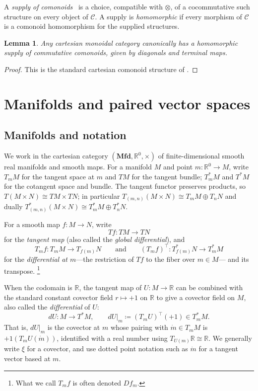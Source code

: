 \documentclass[11pt, oneside, article]{memoir}
\theoremstyle{definition}
\theoremstyle{plain}
\newtheorem{lemma}[lemma]{Lemma}
\newcommand{\cat}[1]{\mathcal{#1}}%
\newcommand{\Cat}[1]{\mathbf{#1}}%
\newcommand{\rr}{\mathbb{R}}
\newcommand{\qqand}{\qquad\text{and}\qquad}
\newcommand{\mfd}{\Cat{Mfd}}
\begin{document}
A \emph{supply of comonoids}~\cite{fong2019supplying} is a choice, compatible with $\otimes$, of a cocommutative such structure on every object of $\cat{C}$. A supply is \emph{homomorphic} if every morphism of $\cat C$ is a comonoid homomorphism for the supplied structures.

\begin{lemma}\label{lem.cartesian_homomorphic_supply}
Any cartesian monoidal category canonically has a homomorphic supply of commutative comonoids, given by diagonals and terminal maps.
\end{lemma}

\begin{proof}
This is the standard cartesian comonoid structure of \cite{fox1976coalgebras}.
\end{proof}

\section{Manifolds and paired vector spaces}\label{sec.lie_pnla_bg}

\subsection{Manifolds and notation}\label{sec.manifolds_notation}

We work in the cartesian category $(\mfd,\rr^0,\times)$ of finite-dimensional smooth real manifolds and smooth maps. For a manifold $M$ and point $m\colon\rr^0\to M$, write $T_mM$ for the tangent space at $m$ and $TM$ for the tangent bundle; $T^*_mM$ and $T^*M$ for the cotangent space and bundle. The tangent functor preserves products, so $T(M\times N)\cong TM\times TN$; in particular $T_{(m,n)}(M\times N)\cong T_mM\oplus T_nN$ and dually $T^*_{(m,n)}(M\times N)\cong T^*_mM\oplus T^*_nN$.

For a smooth map $f\colon M\to N$, write
\[
Tf\colon TM\to TN
\]
for the \emph{tangent map} (also called the \emph{global differential}), and
\[
T_m f\colon T_mM\to T_{f(m)}N
\qqand
(T_m f)^\top\colon T^*_{f(m)}N\to T^*_mM
\]
for the \emph{differential at $m$}---the restriction of $Tf$ to the fiber over $m\in M$--- and its transpose.%
\footnote{What we call $T_m f$ is often denoted $Df_m$.}

When the codomain is $\rr$, the tangent map of $U\colon M\to\rr$ can be combined with the standard constant covector field $r\mapsto +1$ on $\rr$ to give a covector field on $M$, also called the \emph{differential} of $U$:
\begin{equation}\label{eqn.differential}
dU\colon M\to T^*M,\qquad dU|_m\coloneqq(T_m U)^\top(+1)\in T^*_mM.
\end{equation}
That is, $dU|_m$ is the covector at $m$ whose pairing with $\dot m\in T_mM$ is $+1(T_m U(\dot m))$, identified with a real number using $T_{U(m)}\rr\cong\rr$. We generally write $\xi$ for a covector, and use dotted point notation such as $\dot m$ for a tangent vector based at $m$.
\end{document}

